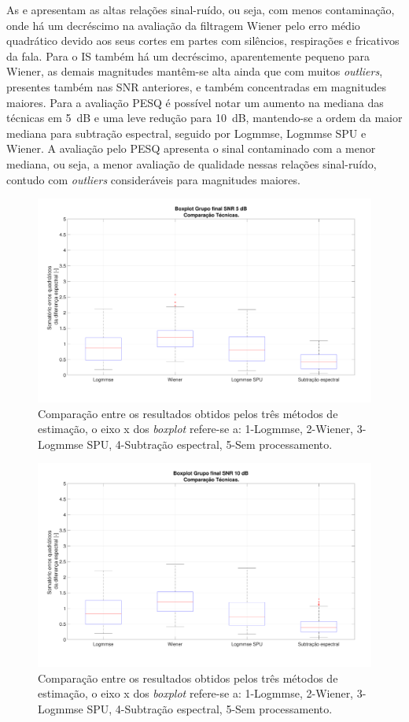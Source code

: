 As  e  apresentam as altas relações sinal-ruído, ou seja, com menos contaminação, onde há um decréscimo na avaliação da filtragem Wiener pelo erro médio quadrático devido aos seus cortes em partes com silêncios, respirações e fricativos da fala. Para o IS também há um decréscimo, aparentemente pequeno para Wiener, as demais magnitudes mantêm-se alta ainda que com muitos \textit{outliers}, presentes também nas SNR anteriores, e também concentradas em magnitudes maiores. Para a avaliação PESQ é possível notar um aumento na mediana das técnicas em 5~dB e uma leve redução para 10~dB, mantendo-se a ordem da maior mediana para subtração espectral, seguido por Logmmse, Logmmse SPU e Wiener. A avaliação pelo PESQ apresenta o sinal contaminado com a menor mediana, ou seja, a menor avaliação de qualidade nessas relações sinal-ruído, contudo com \textit{outliers} consideráveis para magnitudes maiores.

\begin{figure}[H]
\centering
\includegraphics[width=1\linewidth]{Figs/Total_5}
\caption{Comparação entre os resultados obtidos pelos três métodos de estimação, o eixo x dos \textit{boxplot} refere-se a: 1-Logmmse, 2-Wiener, 3-Logmmse SPU, 4-Subtração espectral, 5-Sem processamento.}
\label{q4}
\end{figure}

\begin{figure}[H]
\centering
\includegraphics[width=1\linewidth]{Figs/Total_10}
\caption{Comparação entre os resultados obtidos pelos três métodos de estimação, o eixo x dos \textit{boxplot} refere-se a: 1-Logmmse, 2-Wiener, 3-Logmmse SPU, 4-Subtração espectral, 5-Sem processamento.}
\label{q5}
\end{figure}

